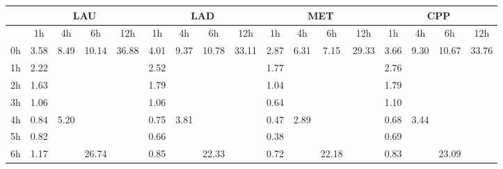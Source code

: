 \begin{center}
\begin{tabular}{l || c | c | c | c | c | c | c | c | c | c | c | c | c | c | c | c |}\hline
 & \multicolumn{4}{c|}{LAU} & \multicolumn{4}{c|}{LAD} & \multicolumn{4}{c|}{MET} & \multicolumn{4}{c|}{CPP} \\\hline
 & 1h & 4h & 6h & 12h & 1h & 4h & 6h & 12h & 1h & 4h & 6h & 12h & 1h & 4h & 6h & 12h \\\hline
0h & \multirow{1}{*}{ 3.58 }  & \multirow{4}{*}{ 8.49 }  & \multirow{6}{*}{ 10.14 }  & \multirow{12}{*}{ 36.88 }  & \multirow{1}{*}{ 4.01 }  & \multirow{4}{*}{ 9.37 }  & \multirow{6}{*}{ 10.78 }  & \multirow{12}{*}{ 33.11 }  & \multirow{1}{*}{ 2.87 }  & \multirow{4}{*}{ 6.31 }  & \multirow{6}{*}{ 7.15 }  & \multirow{12}{*}{ 29.33 }  & \multirow{1}{*}{ 3.66 }  & \multirow{4}{*}{ 9.30 }  & \multirow{6}{*}{ 10.67 }  & \multirow{12}{*}{ 33.76 }  \\\cline{1-1}\cline{5-5}\cline{9-9}\cline{13-13}
1h & \multirow{1}{*}{ 2.22 }  & & & & \multirow{1}{*}{ 2.52 }  & & & & \multirow{1}{*}{ 1.77 }  & & & & \multirow{1}{*}{ 2.76 }  & & & \\\cline{1-1}\cline{5-5}\cline{9-9}\cline{13-13}
2h & \multirow{1}{*}{ 1.63 }  & & & & \multirow{1}{*}{ 1.79 }  & & & & \multirow{1}{*}{ 1.04 }  & & & & \multirow{1}{*}{ 1.79 }  & & & \\\cline{1-1}\cline{5-5}\cline{9-9}\cline{13-13}
3h & \multirow{1}{*}{ 1.06 }  & & & & \multirow{1}{*}{ 1.06 }  & & & & \multirow{1}{*}{ 0.64 }  & & & & \multirow{1}{*}{ 1.10 }  & & & \\\cline{1-1}\cline{5-5}\cline{9-9}\cline{13-13}\cline{2-2}\cline{6-6}\cline{10-10}\cline{14-14}
4h & \multirow{1}{*}{ 0.84 }  & \multirow{4}{*}{ 5.20 }  & & & \multirow{1}{*}{ 0.75 }  & \multirow{4}{*}{ 3.81 }  & & & \multirow{1}{*}{ 0.47 }  & \multirow{4}{*}{ 2.89 }  & & & \multirow{1}{*}{ 0.68 }  & \multirow{4}{*}{ 3.44 }  & & \\\cline{1-1}\cline{5-5}\cline{9-9}\cline{13-13}
5h & \multirow{1}{*}{ 0.82 }  & & & & \multirow{1}{*}{ 0.66 }  & & & & \multirow{1}{*}{ 0.38 }  & & & & \multirow{1}{*}{ 0.69 }  & & & \\\cline{1-1}\cline{5-5}\cline{9-9}\cline{13-13}\cline{3-3}\cline{7-7}\cline{11-11}\cline{15-15}
6h & \multirow{1}{*}{ 1.17 }  & & \multirow{6}{*}{ 26.74 }  & & \multirow{1}{*}{ 0.85 }  & & \multirow{6}{*}{ 22.33 }  & & \multirow{1}{*}{ 0.72 }  & & \multirow{6}{*}{ 22.18 }  & & \multirow{1}{*}{ 0.83 }  & & \multirow{6}{*}{ 23.09 }  & \\\cline{1-1}\cline{5-5}\cline{9-9}\cline{13-13}

\end{tabular}
\end{center}

